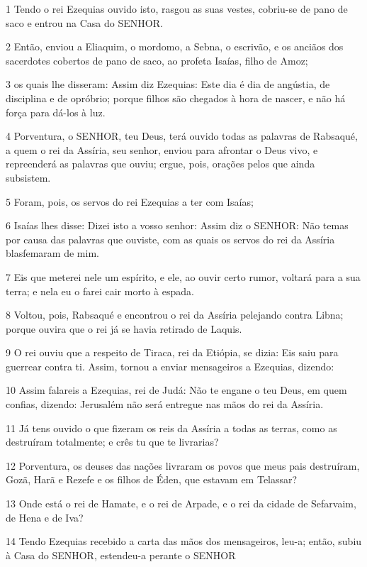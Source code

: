 \par 1 Tendo o rei Ezequias ouvido isto, rasgou as suas vestes, cobriu-se de pano de saco e entrou na Casa do SENHOR.
\par 2 Então, enviou a Eliaquim, o mordomo, a Sebna, o escrivão, e os anciãos dos sacerdotes cobertos de pano de saco, ao profeta Isaías, filho de Amoz;
\par 3 os quais lhe disseram: Assim diz Ezequias: Este dia é dia de angústia, de disciplina e de opróbrio; porque filhos são chegados à hora de nascer, e não há força para dá-los à luz.
\par 4 Porventura, o SENHOR, teu Deus, terá ouvido todas as palavras de Rabsaqué, a quem o rei da Assíria, seu senhor, enviou para afrontar o Deus vivo, e repreenderá as palavras que ouviu; ergue, pois, orações pelos que ainda subsistem.
\par 5 Foram, pois, os servos do rei Ezequias a ter com Isaías;
\par 6 Isaías lhes disse: Dizei isto a vosso senhor: Assim diz o SENHOR: Não temas por causa das palavras que ouviste, com as quais os servos do rei da Assíria blasfemaram de mim.
\par 7 Eis que meterei nele um espírito, e ele, ao ouvir certo rumor, voltará para a sua terra; e nela eu o farei cair morto à espada.
\par 8 Voltou, pois, Rabsaqué e encontrou o rei da Assíria pelejando contra Libna; porque ouvira que o rei já se havia retirado de Laquis.
\par 9 O rei ouviu que a respeito de Tiraca, rei da Etiópia, se dizia: Eis saiu para guerrear contra ti. Assim, tornou a enviar mensageiros a Ezequias, dizendo:
\par 10 Assim falareis a Ezequias, rei de Judá: Não te engane o teu Deus, em quem confias, dizendo: Jerusalém não será entregue nas mãos do rei da Assíria.
\par 11 Já tens ouvido o que fizeram os reis da Assíria a todas as terras, como as destruíram totalmente; e crês tu que te livrarias?
\par 12 Porventura, os deuses das nações livraram os povos que meus pais destruíram, Gozã, Harã e Rezefe e os filhos de Éden, que estavam em Telassar?
\par 13 Onde está o rei de Hamate, e o rei de Arpade, e o rei da cidade de Sefarvaim, de Hena e de Iva?
\par 14 Tendo Ezequias recebido a carta das mãos dos mensageiros, leu-a; então, subiu à Casa do SENHOR, estendeu-a perante o SENHOR

